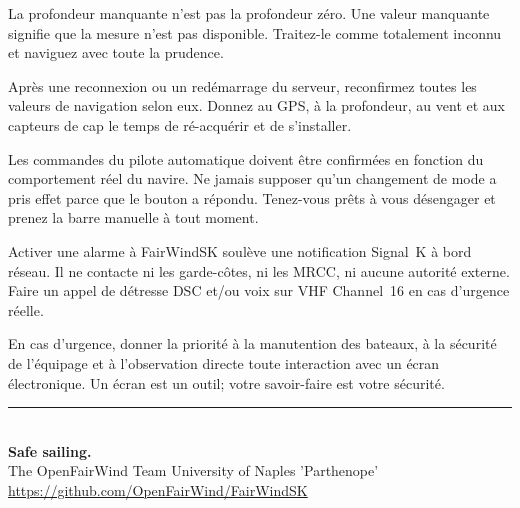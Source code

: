 \begin{warningbox}
La profondeur manquante n'est pas la profondeur zéro.
Une valeur manquante signifie que la mesure n'est pas disponible.
Traitez-le comme totalement inconnu et naviguez avec toute la prudence.
\end{warningbox}

\begin{warningbox}
Après une reconnexion ou un redémarrage du serveur, reconfirmez toutes les valeurs de navigation
selon eux.
Donnez au GPS, à la profondeur, au vent et aux capteurs de cap le temps de ré-acquérir et de s'installer.
\end{warningbox}

\begin{warningbox}
Les commandes du pilote automatique doivent être confirmées en fonction du comportement réel du navire.
Ne jamais supposer qu'un changement de mode a pris effet parce que le bouton a répondu.
Tenez-vous prêts à vous désengager et prenez la barre manuelle à tout moment.
\end{warningbox}

\begin{warningbox}
Activer une alarme à FairWindSK soulève une notification Signal~K à bord
réseau.
Il ne contacte ni les garde-côtes, ni les MRCC, ni aucune autorité externe.
Faire un appel de détresse DSC et/ou voix sur VHF Channel~16 en cas d'urgence réelle.
\end{warningbox}

\begin{warningbox}
En cas d'urgence, donner la priorité à la manutention des bateaux, à la sécurité de l'équipage et à l'observation directe
toute interaction avec un écran électronique.
Un écran est un outil; votre savoir-faire est votre sécurité.
\end{warningbox}

\vfill
\begin{center}
  {\color{Teal}\rule{0.5\textwidth}{1pt}}\\[10pt]
  {\Large\sffamily\bfseries\color{Navy}Safe sailing.}\\[8pt]
  {\normalsize\sffamily\color{gray}
    The OpenFairWind Team \textbullet{}
    University of Naples 'Parthenope'}\\[4pt]
  {\small\sffamily\color{Teal}\url{https://github.com/OpenFairWind/FairWindSK}}
\end{center}
